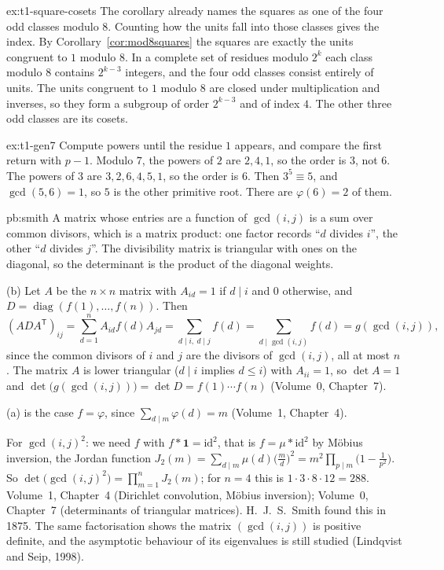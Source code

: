 \begin{solution}{ex:t1-square-cosets}
\idea The corollary already names the squares as one of the four odd classes modulo $8$. Counting how the units fall into those classes gives the index.
\writeup By Corollary~\ref{cor:mod8squares} the squares are exactly the units congruent to $1$ modulo $8$. In a complete set of residues modulo $2^k$ each class modulo $8$ contains $2^{k-3}$ integers, and the four odd classes consist entirely of units. The units congruent to $1$ modulo $8$ are closed under multiplication and inverses, so they form a subgroup of order $2^{k-3}$ and of index $4$. The other three odd classes are its cosets.
\end{solution}

\begin{solution}{ex:t1-gen7}
\idea Compute powers until the residue $1$ appears, and compare the first return with $p-1$.
\writeup Modulo $7$, the powers of $2$ are $2,4,1$, so the order is $3$, not $6$. The powers of $3$ are $3,2,6,4,5,1$, so the order is $6$. Then $3^5\equiv 5$, and $\gcd(5,6)=1$, so $5$ is the other primitive root. There are $\varphi(6)=2$ of them.
\end{solution}

\begin{solution}{pb:smith}
\idea A matrix whose entries are a function of $\gcd(i,j)$ is a sum over common divisors, which is a matrix product: one
factor records ``$d$ divides $i$'', the other ``$d$ divides $j$''. The divisibility matrix is triangular with ones on the
diagonal, so the determinant is the product of the diagonal weights.

\writeup (b) Let $A$ be the $n\times n$ matrix with $A_{id}=1$ if $d\mid i$ and $0$ otherwise, and $D=\operatorname{diag}
(f(1),\dots,f(n))$. Then
\[
(ADA^{\mathsf T})_{ij}=\sum_{d=1}^nA_{id}f(d)A_{jd}=\sum_{d\mid i,\ d\mid j}f(d)=\sum_{d\mid\gcd(i,j)}f(d)=g(\gcd(i,j)),
\]
since the common divisors of $i$ and $j$ are the divisors of $\gcd(i,j)$, all at most $n$. The matrix $A$ is lower triangular
($d\mid i$ implies $d\le i$) with $A_{ii}=1$, so $\det A=1$ and $\det\bigl(g(\gcd(i,j))\bigr)=\det D=f(1)\cdots f(n)$ (Volume~0,
Chapter~7).

(a) is the case $f=\varphi$, since $\sum_{d\mid m}\varphi(d)=m$ (Volume~1, Chapter~4).

For $\gcd(i,j)^2$: we need $f$ with $f*\mathbf1=\mathrm{id}^2$, that is $f=\mu*\mathrm{id}^2$ by Möbius inversion, the Jordan
function $J_2(m)=\sum_{d\mid m}\mu(d)\bigl(\frac md\bigr)^2=m^2\prod_{p\mid m}\bigl(1-\frac1{p^2}\bigr)$. So
$\det\bigl(\gcd(i,j)^2\bigr)=\prod_{m=1}^nJ_2(m)$; for $n=4$ this is $1\cdot3\cdot8\cdot12=288$.
\tools Volume~1, Chapter~4 (Dirichlet convolution, Möbius inversion); Volume~0, Chapter~7 (determinants of triangular matrices).
\leads H.~J.~S.~Smith found this in 1875. The same factorisation shows the matrix $(\gcd(i,j))$ is positive definite, and
the asymptotic behaviour of its eigenvalues is still studied (Lindqvist and Seip, 1998).
\end{solution}

